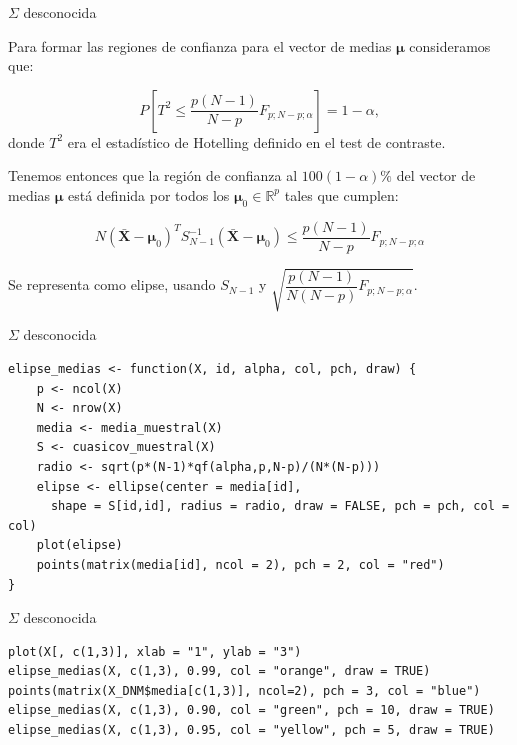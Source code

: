 \documentclass[xcolor=table]{beamer}
\begin{document}
\begin{frame}[fragile]{$\Sigma$ desconocida}

Para formar las regiones de confianza para el vector de medias $\pmb{\mu}$ consideramos que:

$$P\left[T^2 \leq \dfrac{p(N-1)}{N-p} F_{p;N-p;\alpha}\right]= 1 - \alpha,$$
donde $T^2$ era el estadístico de Hotelling definido en el test de contraste.

Tenemos entonces que la región de confianza al $100(1 - \alpha)\%$ del vector de medias $\pmb{\mu}$ está definida por todos los $\pmb{\mu}_0 \in \mathbb{R}^p$ tales que cumplen:

$$N (\pmb{\bar{X}} - \pmb{\mu}_0)^T S_{N-1}^{-1}(\pmb{\bar{X}} - \pmb{\mu}_0) \leq \dfrac{p(N-1)}{N-p} F_{p;N-p;\alpha} $$

Se representa como elipse, usando $S_{N-1}$ y $\sqrt{\dfrac{p(N-1)}{N(N-p)} F_{p;N-p;\alpha}}$.

\end{frame}



\begin{frame}[fragile]{$\Sigma$ desconocida}

\begin{lstlisting}
elipse_medias <- function(X, id, alpha, col, pch, draw) {
    p <- ncol(X)
    N <- nrow(X)
    media <- media_muestral(X)
    S <- cuasicov_muestral(X)
    radio <- sqrt(p*(N-1)*qf(alpha,p,N-p)/(N*(N-p)))
    elipse <- ellipse(center = media[id], 
      shape = S[id,id], radius = radio, draw = FALSE, pch = pch, col = col)
    plot(elipse)
    points(matrix(media[id], ncol = 2), pch = 2, col = "red")
}
\end{lstlisting}

\end{frame}


\begin{frame}[fragile]{$\Sigma$ desconocida}

\begin{lstlisting}
plot(X[, c(1,3)], xlab = "1", ylab = "3")
elipse_medias(X, c(1,3), 0.99, col = "orange", draw = TRUE)
points(matrix(X_DNM$media[c(1,3)], ncol=2), pch = 3, col = "blue")
elipse_medias(X, c(1,3), 0.90, col = "green", pch = 10, draw = TRUE)
elipse_medias(X, c(1,3), 0.95, col = "yellow", pch = 5, draw = TRUE)
\end{lstlisting}

\end{frame}
\end{document}
